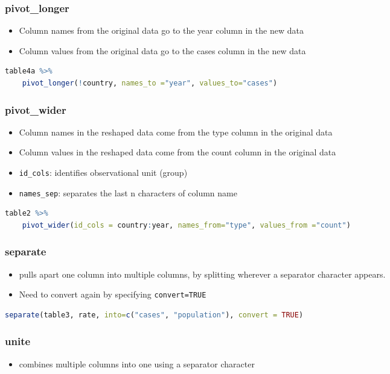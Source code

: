 \documentclass{article}
\begin{document}
\begin{multicols}{2}
\subsubsection{pivot\_longer}
\begin{itemize}
	\item Column names from the original data go to the year column in the new data
	\item Column values from the original data go to the cases column in the new data
\end{itemize}
\begin{lstlisting}[language=R]
table4a %>%
	pivot_longer(!country, names_to ="year", values_to="cases")
\end{lstlisting}
\subsubsection{pivot\_wider}
\begin{itemize}
	\item Column names in the reshaped data come from the type column in the original data
	\item Column values in the reshaped data come from the count column in the original data
	\item \texttt{id\_cols}: identifies observational unit (group)
	\item \texttt{names\_sep}: separates the last n characters of column name
\end{itemize}
\begin{lstlisting}[language=R]
table2 %>%
	pivot_wider(id_cols = country:year, names_from="type", values_from ="count")
\end{lstlisting}
\subsubsection{separate}
\begin{itemize}
	\item pulls apart one column into multiple columns, by splitting wherever a separator character appears.
	\item Need to convert again by specifying \texttt{convert=TRUE}

\end{itemize}
\begin{lstlisting}[language=R]
separate(table3, rate, into=c("cases", "population"), convert = TRUE)
\end{lstlisting}
\subsubsection{unite}
\begin{itemize}
	\item combines multiple columns into one using a separator character
\end{itemize}


\end{multicols}
\end{document}
